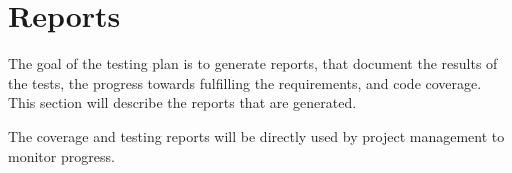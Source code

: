 %
%
\section{Reports}
\label{sec:reports}

The goal of the testing plan is to generate reports, that document the results of the tests, the progress towards fulfilling the requirements, and code coverage. This section will describe the reports that are generated.

The coverage and testing reports will be directly used by project management to monitor progress.



%
%
